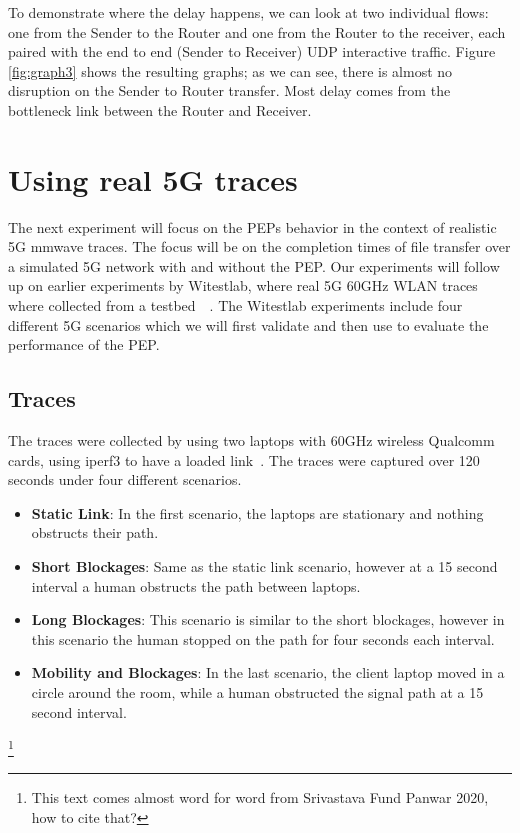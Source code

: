 \documentclass[a4paper,english, 11pt]{report}
\begin{document}
To demonstrate where the delay happens, we can look at two individual flows: one from the Sender to the Router and one from the Router to the receiver, each paired with the end to end (Sender to Receiver) UDP interactive traffic. Figure \ref{fig:graph3} shows the resulting graphs; as we can see, there is almost no disruption on the Sender to Router transfer. Most delay comes from the bottleneck link between the Router and Receiver.

\section{Using real 5G traces}

The next experiment will focus on the PEPs behavior in the context of realistic 5G mmwave traces. The focus will be on the completion times of file transfer over a simulated 5G network with and without the PEP. Our experiments will follow up on earlier experiments by Witestlab, where real 5G 60GHz WLAN traces where collected from a testbed~\cite{Srivastava_Fund_Panwar_2020}~\cite{hingane2020aqm}. The Witestlab experiments include four different 5G scenarios which we will first validate and then use to evaluate the performance of the PEP.

\subsection{Traces}
The traces were collected by using two laptops with 60GHz wireless Qualcomm cards, using iperf3 to have a loaded link~\cite{Srivastava_Fund_Panwar_2020}. The traces were captured over 120 seconds under four different scenarios.

\begin{itemize}
  \item \textbf{Static Link}: In the first scenario, the laptops are stationary and nothing obstructs their path.
  \item \textbf{Short Blockages}: Same as the static link scenario, however at a 15 second interval a human obstructs the path between laptops.
  \item \textbf{Long Blockages}: This scenario is similar to the short blockages, however in this scenario the human stopped on the path for four seconds each interval.
  \item \textbf{Mobility and Blockages}: In the last scenario, the client laptop moved in a circle around the room, while a human obstructed the signal path at a 15 second interval.
\end{itemize}\footnote{This text comes almost word for word from Srivastava Fund Panwar 2020, how to cite that?}
\end{document}
